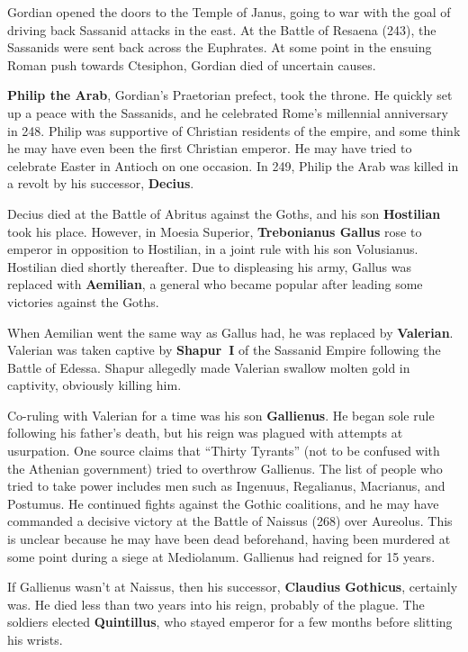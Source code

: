 Gordian opened the doors to the Temple of Janus,
going to war with the goal of driving back Sassanid attacks in the east.
At the Battle of Resaena (243), the Sassanids were sent back across the Euphrates.
At some point in the ensuing Roman push towards Ctesiphon,
Gordian died of uncertain causes.

\textbf{Philip the Arab}, Gordian's Praetorian prefect, took the throne.
He quickly set up a peace with the Sassanids,
and he celebrated Rome's millennial anniversary in 248.
Philip was supportive of Christian residents of the empire,
and some think he may have even been the first Christian emperor.
He may have tried to celebrate Easter in Antioch on one occasion.
In 249, Philip the Arab was killed in a revolt by his successor, \textbf{Decius}.

Decius died at the Battle of Abritus against the Goths,
and his son \textbf{Hostilian} took his place.
However, in Moesia Superior, \textbf{Trebonianus Gallus} rose to emperor in opposition to Hostilian,
in a joint rule with his son Volusianus.
Hostilian died shortly thereafter.
Due to displeasing his army, Gallus was replaced with \textbf{Aemilian},
a general who became popular after leading some victories against the Goths.

When Aemilian went the same way as Gallus had, he was replaced by \textbf{Valerian}.
Valerian was taken captive by \textbf{Shapur~I} of the Sassanid Empire
following the Battle of Edessa.
Shapur allegedly made Valerian swallow molten gold in captivity, obviously killing him.

Co-ruling with Valerian for a time was his son \textbf{Gallienus}.
He began sole rule following his father's death,
but his reign was plagued with attempts at usurpation.
One source claims that ``Thirty Tyrants'' (not to be confused with the Athenian government)
tried to overthrow Gallienus.
The list of people who tried to take power includes men such as
Ingenuus, Regalianus, Macrianus, and Postumus.
He continued fights against the Gothic coalitions,
and he may have commanded a decisive victory at the Battle of Naissus (268) over Aureolus.
This is unclear because he may have been dead beforehand,
having been murdered at some point during a siege at Mediolanum.
Gallienus had reigned for 15 years.

If Gallienus wasn't at Naissus, then his successor, \textbf{Claudius Gothicus}, certainly was.
He died less than two years into his reign, probably of the plague.
The soldiers elected \textbf{Quintillus},
who stayed emperor for a few months before slitting his wrists.

